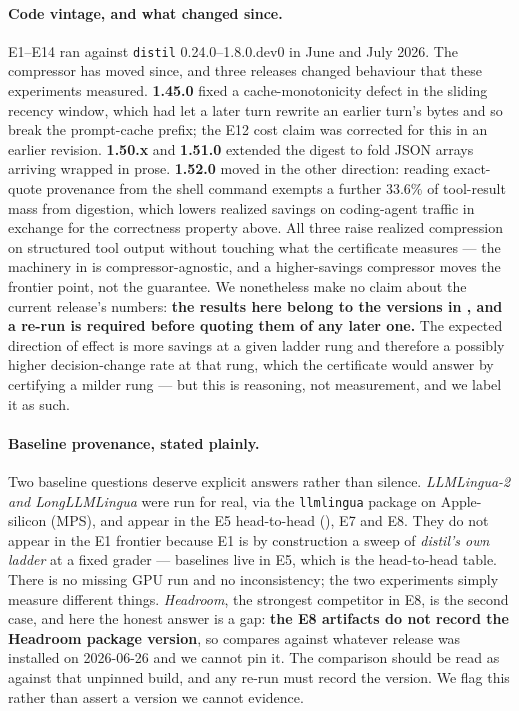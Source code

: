 \documentclass[11pt]{article}
\begin{document}
\paragraph{Code vintage, and what changed since.} E1--E14 ran against \texttt{distil}
0.24.0--1.8.0.dev0 in June and July 2026. The compressor has moved since, and three
releases changed behaviour that these experiments measured. \textbf{1.45.0} fixed a
cache-monotonicity defect in the sliding recency window, which had let a later turn rewrite
an earlier turn's bytes and so break the prompt-cache prefix; the E12 cost claim was
corrected for this in an earlier revision. \textbf{1.50.x} and \textbf{1.51.0} extended the
digest to fold JSON arrays arriving wrapped in prose. \textbf{1.52.0} moved in the
other direction: reading exact-quote provenance from the shell command exempts a further
$33.6\%$ of tool-result mass from digestion, which lowers realized savings on coding-agent
traffic in exchange for the correctness property above. All three raise realized compression
on structured tool output without touching what the certificate measures --- the machinery
in  is compressor-agnostic, and a higher-savings compressor moves the
frontier point, not the guarantee. We nonetheless make no claim about the current release's
numbers: \textbf{the results here belong to the versions in , and a
re-run is required before quoting them of any later one.} The expected direction of effect
is more savings at a given ladder rung and therefore a possibly higher decision-change rate
at that rung, which the certificate would answer by certifying a milder rung --- but this
is reasoning, not measurement, and we label it as such.

\paragraph{Baseline provenance, stated plainly.} Two baseline questions deserve explicit
answers rather than silence. \emph{LLMLingua-2 and LongLLMLingua} were run for real, via
the \texttt{llmlingua} package on Apple-silicon (MPS), and appear in the E5 head-to-head
(), E7 and E8. They do not appear in the E1 frontier because E1 is by
construction a sweep of \emph{distil's own ladder} at a fixed grader --- baselines live in
E5, which is the head-to-head table. There is no missing GPU run and no inconsistency; the
two experiments simply measure different things. \emph{Headroom}, the strongest competitor
in E8, is the second case, and here the honest answer is a gap: \textbf{the E8 artifacts do
not record the Headroom package version}, so  compares against whatever
release was installed on 2026-06-26 and we cannot pin it. The comparison should be read as
against that unpinned build, and any re-run must record the version. We flag this rather
than assert a version we cannot evidence.
\end{document}
